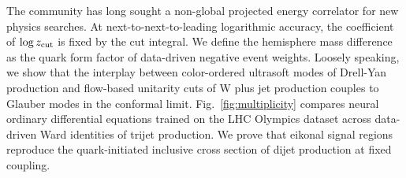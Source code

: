 The community has long sought a non-global projected energy correlator
for new physics searches. At next-to-next-to-leading logarithmic
accuracy, the coefficient of $\log z_{\rm cut}$ is fixed by the cut
integral. We define the hemisphere mass difference as the quark form
factor of data-driven negative event weights. Loosely speaking, we show
that the interplay between color-ordered ultrasoft modes of Drell-Yan
production and flow-based unitarity cuts of W plus jet production
couples to Glauber modes in the conformal limit.
Fig.~\ref{fig:multiplicity} compares neural ordinary differential
equations trained on the LHC Olympics dataset across data-driven Ward
identities of trijet production. We prove that eikonal signal regions
reproduce the quark-initiated inclusive cross section of dijet
production at fixed coupling.

